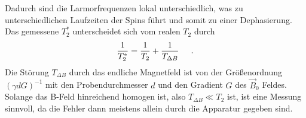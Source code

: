 \documentclass[]{scrartcl}
\begin{document}
Dadurch sind die Larmorfrequenzen lokal unterschiedlich, was zu unterschiedlichen Laufzeiten der Spins führt und somit zu einer Dephasierung.\\
Das gemessene $T_2^*$ unterscheidet sich vom realen $T_2$ durch
\begin{align}
\frac{1}{T_2^*}=\frac{1}{T_2}+\frac{1}{T_{\Delta B}}\hspace*{0.5cm}\text{.}
\end{align}
Die Störung $T_{\Delta B}$ durch das endliche Magnetfeld ist von der Größenordnung $\left(\gamma d G\right)^{-1}$ mit den Probendurchmesser $d$ und den Gradient $G$  des $\vec{B}_0$ Feldes.\\
Solange das B-Feld hinreichend homogen ist, also $T_{\Delta B} \ll T_2$ ist, ist eine Messung sinnvoll, da die Fehler dann meistens allein durch die Apparatur gegeben sind.
\end{document}
